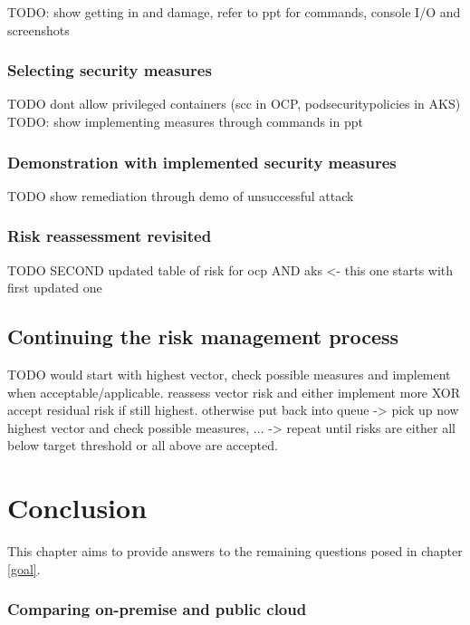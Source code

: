 TODO: show getting in and damage, refer to ppt for commands, console I/O and screenshots

\subsection{Selecting security measures}
TODO dont allow privileged containers (scc in OCP, podsecuritypolicies in AKS)
TODO: show implementing measures through commands in ppt

\subsection{Demonstration with implemented security measures}

TODO show remediation through demo of unsuccessful attack

\subsection{Risk reassessment revisited}

TODO SECOND updated table of risk for ocp AND aks <- this one starts with first updated one

\section{Continuing the risk management process}

TODO would start with highest vector, check possible measures and implement when acceptable/applicable. reassess vector risk and either implement more XOR accept residual risk if still highest. otherwise put back into queue -> pick up now highest vector and check possible measures, ... -> repeat until risks are either all below target threshold or all above are accepted.

\chapter{Conclusion}
This chapter aims to provide answers to the remaining questions posed in chapter \ref{goal}.

\subsection{Comparing on-premise and public cloud}


